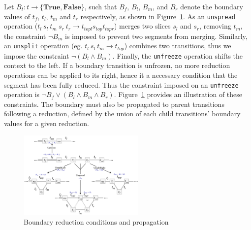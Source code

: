 \documentclass[12pt,a4paper,twoside,openany]{report} \usepackage[pdfborder={0 0 0}]{hyperref}    %
\theoremstyle{definition} \newtheorem{definition}{Definition}[section]
\begin{document}
  Let $B_t : t \to \{\textbf{True}, \textbf{False}\}$, such that $B_f$, $B_l$, $B_m$, and $B_r$ denote the boundary values of $t_f$, $t_l$, $t_m$ and
  $t_r$ respectively, as shown in Figure~\ref{fig:parseStateOptions}. As an \texttt{unspread} operation ($t_l~s_l~t_m~s_r~t_r \to t_{topl} s_{top} t_{topr} $) merges
  two slices $s_l$ and $s_r$, removing $t_m$, the constraint $\lnot B_m$ is imposed to prevent two segments from
  merging. Similarly, an \texttt{unsplit} operation (eg. $t_l~s_l~t_m \to t_{top}$) combines two transitions, thus we
  impose the constraint $\lnot (B_l \wedge B_m)$. Finally, the \texttt{unfreeze} operation shifts the context to the
  left. If a boundary transition is unfrozen, no more reduction operations can be applied to its right, hence it
  a necessary condition that the segment has been fully reduced. Thus the constraint imposed on an \texttt{unfreeze}
  operation is $\lnot B_f \vee (B_l \wedge B_m \wedge B_r)$. Figure~\ref{fig:parseStateOptions} provides an illustration of these constraints. The boundary must also be propagated to parent transitions following a reduction, defined by the union of each child transitions' boundary values for a given reduction.
  \begin{figure}[ht] 
    \centering 
    \includegraphics[width=0.55\textwidth]{impl/boundarydiagram/diag.png} \caption{Boundary
  reduction conditions and propagation} 
\label{fig:parseStateOptions} 
\end{figure}
\end{document}
